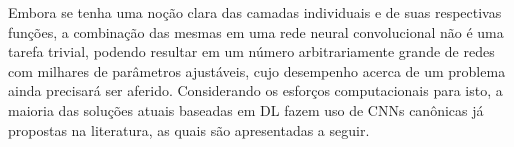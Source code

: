 Embora se tenha uma noção clara das camadas individuais e de suas respectivas funções, a combinação das mesmas em uma rede neural convolucional não é uma tarefa trivial, podendo resultar em um número arbitrariamente grande de redes com milhares de parâmetros ajustáveis, cujo desempenho acerca de um problema ainda precisará ser aferido. Considerando os esforços computacionais para isto, a maioria das soluções atuais baseadas em DL fazem uso de CNNs canônicas já propostas na literatura, as quais são apresentadas a seguir.
